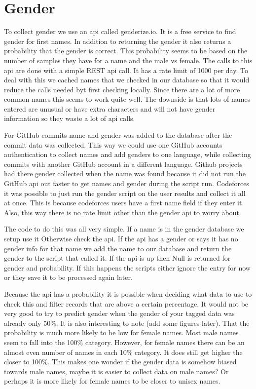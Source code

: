 \documentclass{article}
\begin{document}
\section{Gender}
To collect gender we use an api called genderize.io. It is a free service to find gender for first names. In addition to returning the gender it also returns a probability that the gender is correct. This probability seems to be based on the number of samples they have for a name and the male vs female. The calls to this api are done with a simple REST api call. It has a rate limit of 1000 per day. To deal with this we cached names that we checked in our database so that it would reduce the calls needed byt first checking locally. Since there are a lot of more common names this seems to work quite well. The downside is that lots of names entered are unusual or have extra characters and will not have gender information so they waste a lot of api calls.

For GitHub commits name and gender was added to the database after the commit data was collected. This way we could use one GitHub accounts authentication to collect names and add genders to one language, while collecting commits with another GitHub account in a different language. Github projects had there gender collected when the name was found because it did not run the GitHub api out faster to get names and gender during the script run. Codeforces it was possible to just run the gender script on the user results and collect it all at once. This is because codeforces users have a first name field if they enter it. Also, this way there is no rate limit other than the gender api to worry about.

The code to do this was all very simple. If a name is in the gender database we setup use it Otherwise check the api. If the api has a gender or says it has no gender info for that name we add the name to our database and return the gender to the script that called it. If the api is up then Null is returned for gender and probability. If this happens the scripts either ignore the entry for now or they  save it to be processed again later.

Because the api has a probability it is possible when deciding what data to use to check this and filter records that are above a certain percentage. It would not be very good to try to predict gender when the gender of your tagged data was already only 50\%. It is also interesting to note (add some figures later). That the probability is much more likely to be low for female names. Most male names seem to fall into the 100\% category. However, for female names there can be an almost even number of names in each 10\% category. It does still get higher the closer to 100\%. This makes one wonder if the gender data is somehow biased towards male names, maybe it is easier to collect data on male names? Or perhaps it is more likely for female names to be closer to unisex names.


\end{document}
